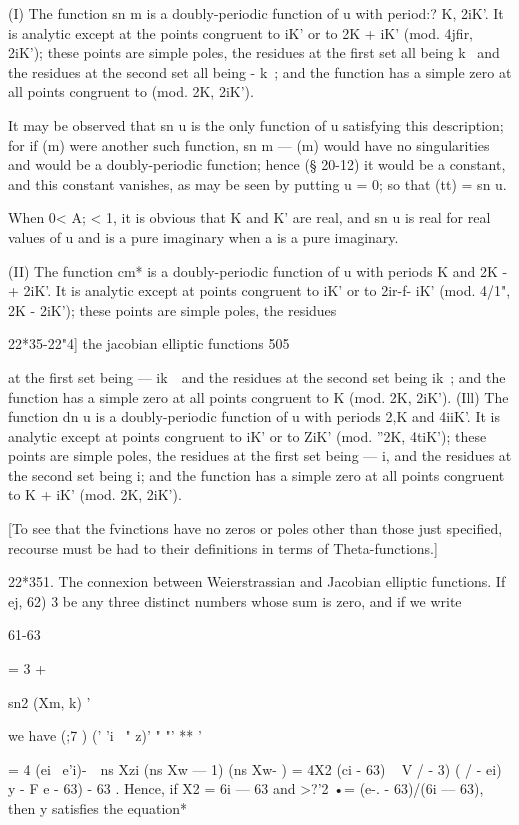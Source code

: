 (I) The function sn m is a doubly-periodic function of u with period:?
K, 2iK'. It is analytic except at the points congruent to iK' or to 2K
+ iK' (mod. 4jfir, 2iK'); these points are simple poles, the residues
at the first set all being k~ and the residues at the second set all
being - k~; and the function has a simple zero at all points
congruent to (mod. 2K, 2iK').

It may be observed that sn u is the only function of u satisfying this
description; for if (m) were another such function, sn m — (m) would
have no singularities and would be a doubly-periodic function; hence
(§ 20-12) it would be a constant, and this constant vanishes, as may
be seen by putting u = 0; so that (tt) = sn u.

When 0< A; < 1, it is obvious that K and K' are real, and sn u is real
for real values of u and is a pure imaginary when a is a pure
imaginary.

(II) The function cm* is a doubly-periodic function of u with periods
K and 2K -+ 2iK'. It is analytic except at points congruent to iK' or
to 2ir-f- iK' (mod. 4/1", 2K - 2iK'); these points are simple poles,
the residues

22*35-22"4] the jacobian elliptic functions 505

at the first set being — ik~\ and the residues at the second set being
ik~; and the function has a simple zero at all points congruent to K
(mod. 2K, 2iK'). (Ill) The function dn u is a doubly-periodic function
of u with periods 2,K and 4iiK'. It is analytic except at points
congruent to iK' or to ZiK' (mod. ''2K, 4tiK'); these points are
simple poles, the residues at the first set being — i, and the
residues at the second set being i; and the function has a simple
zero at all points congruent to K + iK' (mod. 2K, 2iK').

[To see that the fvinctions have no zeros or poles other than those
just specified, recourse must be had to their definitions in terms of
Theta-functions.]

22*351. The connexion between Weierstrassian and Jacobian elliptic
functions. If ej, 62) 3 be any three distinct numbers whose sum is
zero, and if we write

61-63

  = 3 +

sn2 (Xm, k) '

we have (;7 ) (' 'i ~" z)' " "' ** '

= 4 (ei ~e'i)-\ \ ns Xzi (ns Xw — 1) (ns Xw- ) = 4X2 (ci - 63) ~ V / -
3) ( / - ei) y - F e - 63) - 63 . Hence, if X2 = 6i — 63 and >?'2 •=
(e-. - 63)/(6i — 63), then y satisfies the equation*

